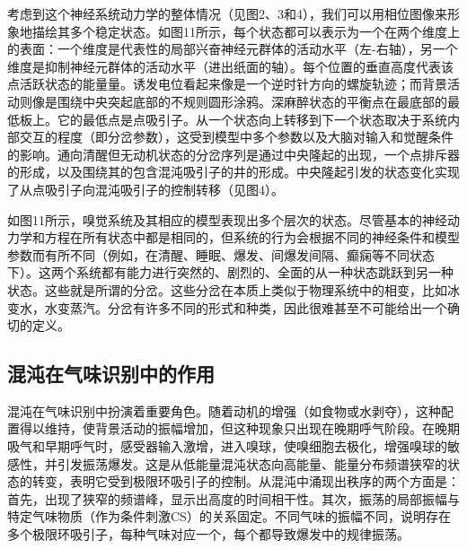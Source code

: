 \documentclass[a4paper,12pt]{article}
\begin{document}
考虑到这个神经系统动力学的整体情况（见图2、3和4），我们可以用相位图像来形象地描绘其多个稳定状态。如图11所示，每个状态都可以表示为一个在两个维度上的表面：一个维度是代表性的局部兴奋神经元群体的活动水平（左-右轴），另一个维度是抑制神经元群体的活动水平（进出纸面的轴）。每个位置的垂直高度代表该点活跃状态的能量量。诱发电位看起来像是一个逆时针方向的螺旋轨迹；而背景活动则像是围绕中央突起底部的不规则圆形涂鸦。深麻醉状态的平衡点在最底部的最低板上。它的最低点是点吸引子。从一个状态向上转移到下一个状态取决于系统内部交互的程度（即分岔参数），这受到模型中多个参数以及大脑对输入和觉醒条件的影响。通向清醒但无动机状态的分岔序列是通过中央隆起的出现，一个点排斥器的形成，以及围绕其的包含混沌吸引子的井的形成。中央隆起引发的状态变化实现了从点吸引子向混沌吸引子的控制转移（见图4）。

如图11所示，嗅觉系统及其相应的模型表现出多个层次的状态。尽管基本的神经动力学和方程在所有状态中都是相同的，但系统的行为会根据不同的神经条件和模型参数而有所不同（例如，在清醒、睡眠、爆发、间爆发间隔、癫痫等不同状态下）。这两个系统都有能力进行突然的、剧烈的、全面的从一种状态跳跃到另一种状态。这些就是所谓的分岔。这些分岔在本质上类似于物理系统中的相变，比如冰变水，水变蒸汽。分岔有许多不同的形式和种类，因此很难甚至不可能给出一个确切的定义。

\subsection{混沌在气味识别中的作用}

混沌在气味识别中扮演着重要角色。随着动机的增强（如食物或水剥夺），这种配置得以维持，使背景活动的振幅增加，但这种现象只出现在晚期呼气阶段。在晚期吸气和早期呼气时，感受器输入激增，进入嗅球，使嗅细胞去极化，增强嗅球的敏感性，并引发振荡爆发。这是从低能量混沌状态向高能量、能量分布频谱狭窄的状态的转变，表明它受到极限环吸引子的控制。从混沌中涌现出秩序的两个方面是：首先，出现了狭窄的频谱峰，显示出高度的时间相干性。其次，振荡的局部振幅与特定气味物质（作为条件刺激CS）的关系固定。不同气味的振幅不同，说明存在多个极限环吸引子，每种气味对应一个，每个都导致爆发中的规律振荡。
\end{document}
